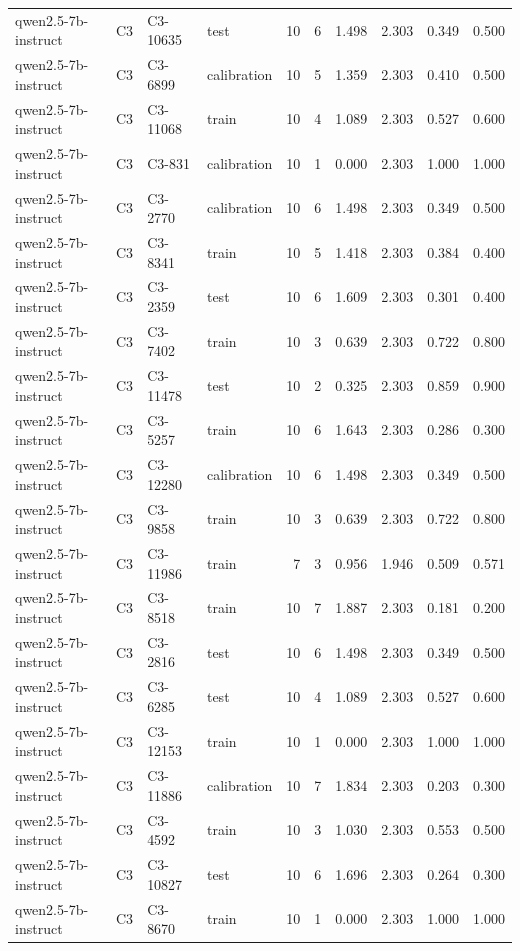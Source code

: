 \begin{table}
\begin{tabular}{llllrrrrrr}
qwen2.5-7b-instruct & C3 & C3-10635 & test & 10 & 6 & 1.498 & 2.303 & 0.349 & 0.500 \\
qwen2.5-7b-instruct & C3 & C3-6899 & calibration & 10 & 5 & 1.359 & 2.303 & 0.410 & 0.500 \\
qwen2.5-7b-instruct & C3 & C3-11068 & train & 10 & 4 & 1.089 & 2.303 & 0.527 & 0.600 \\
qwen2.5-7b-instruct & C3 & C3-831 & calibration & 10 & 1 & 0.000 & 2.303 & 1.000 & 1.000 \\
qwen2.5-7b-instruct & C3 & C3-2770 & calibration & 10 & 6 & 1.498 & 2.303 & 0.349 & 0.500 \\
qwen2.5-7b-instruct & C3 & C3-8341 & train & 10 & 5 & 1.418 & 2.303 & 0.384 & 0.400 \\
qwen2.5-7b-instruct & C3 & C3-2359 & test & 10 & 6 & 1.609 & 2.303 & 0.301 & 0.400 \\
qwen2.5-7b-instruct & C3 & C3-7402 & train & 10 & 3 & 0.639 & 2.303 & 0.722 & 0.800 \\
qwen2.5-7b-instruct & C3 & C3-11478 & test & 10 & 2 & 0.325 & 2.303 & 0.859 & 0.900 \\
qwen2.5-7b-instruct & C3 & C3-5257 & train & 10 & 6 & 1.643 & 2.303 & 0.286 & 0.300 \\
qwen2.5-7b-instruct & C3 & C3-12280 & calibration & 10 & 6 & 1.498 & 2.303 & 0.349 & 0.500 \\
qwen2.5-7b-instruct & C3 & C3-9858 & train & 10 & 3 & 0.639 & 2.303 & 0.722 & 0.800 \\
qwen2.5-7b-instruct & C3 & C3-11986 & train & 7 & 3 & 0.956 & 1.946 & 0.509 & 0.571 \\
qwen2.5-7b-instruct & C3 & C3-8518 & train & 10 & 7 & 1.887 & 2.303 & 0.181 & 0.200 \\
qwen2.5-7b-instruct & C3 & C3-2816 & test & 10 & 6 & 1.498 & 2.303 & 0.349 & 0.500 \\
qwen2.5-7b-instruct & C3 & C3-6285 & test & 10 & 4 & 1.089 & 2.303 & 0.527 & 0.600 \\
qwen2.5-7b-instruct & C3 & C3-12153 & train & 10 & 1 & 0.000 & 2.303 & 1.000 & 1.000 \\
qwen2.5-7b-instruct & C3 & C3-11886 & calibration & 10 & 7 & 1.834 & 2.303 & 0.203 & 0.300 \\
qwen2.5-7b-instruct & C3 & C3-4592 & train & 10 & 3 & 1.030 & 2.303 & 0.553 & 0.500 \\
qwen2.5-7b-instruct & C3 & C3-10827 & test & 10 & 6 & 1.696 & 2.303 & 0.264 & 0.300 \\
qwen2.5-7b-instruct & C3 & C3-8670 & train & 10 & 1 & 0.000 & 2.303 & 1.000 & 1.000 \\

\end{tabular}
\end{table}
